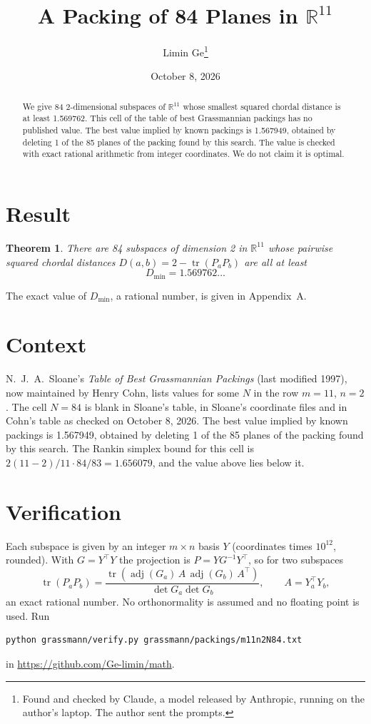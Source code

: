 \documentclass[11pt,a4paper]{article}
\title{A Packing of 84 Planes in $\mathbb{R}^{11}$}
\author{Limin Ge\thanks{Found and checked by Claude, a model released by Anthropic, running on the author's laptop. The author sent the prompts.}}
\date{October 8, 2026}
\newtheorem*{theorem}{Theorem}
\begin{document}
\maketitle
\begin{abstract}
We give 84 2-dimensional subspaces of $\mathbb{R}^{11}$ whose smallest squared chordal distance is at least 1.569762. This cell of the table of best Grassmannian packings has no published value. The best value implied by known packings is 1.567949, obtained by deleting 1 of the 85 planes of the packing found by this search. The value is checked with exact rational arithmetic from integer coordinates. We do not claim it is optimal.
\end{abstract}

\section{Result}
\begin{theorem}
There are 84 subspaces of dimension 2 in $\mathbb{R}^{11}$ whose pairwise squared chordal distances $D(a,b) = 2 - \operatorname{tr}(P_aP_b)$ are all at least
\[ D_{\min} = 1.569762\ldots \]
\end{theorem}
The exact value of $D_{\min}$, a rational number, is given in Appendix~A.


\section{Context}
N.~J.~A.~Sloane's \emph{Table of Best Grassmannian Packings} (last modified 1997), now maintained by Henry Cohn, lists values for some $N$ in the row $m=11$, $n=2$. The cell $N=84$ is blank in Sloane's table, in Sloane's coordinate files and in Cohn's table as checked on October 8, 2026. The best value implied by known packings is 1.567949, obtained by deleting 1 of the 85 planes of the packing found by this search. The Rankin simplex bound for this cell is $2(11-2)/11\cdot 84/83 = 1.656079$, and the value above lies below it.


\section{Verification}
Each subspace is given by an integer $m\times n$ basis $Y$ (coordinates times $10^{12}$, rounded). With $G=Y^\top Y$ the projection is $P=YG^{-1}Y^\top$, so for two subspaces
\[ \operatorname{tr}(P_aP_b)=\frac{\operatorname{tr}(\operatorname{adj}(G_a)\,A\,\operatorname{adj}(G_b)\,A^\top)}{\det G_a\det G_b},\qquad A=Y_a^\top Y_b, \]
an exact rational number. No orthonormality is assumed and no floating point is used. Run
\begin{verbatim}
python grassmann/verify.py grassmann/packings/m11n2N84.txt
\end{verbatim}
in \url{https://github.com/Ge-limin/math}.
\end{document}
